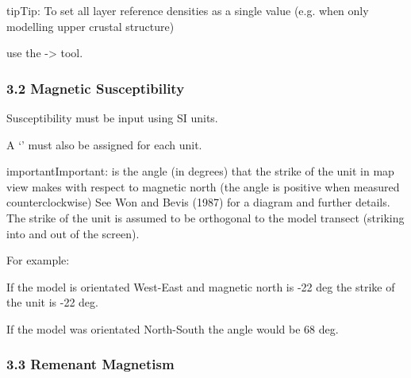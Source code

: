 \documentclass[a4paper,10pt,english]{sphinxmanual}
\begin{document}
\begin{sphinxadmonition}{tip}{Tip:}
To set all layer reference densities as a single value (e.g. when only modelling upper crustal structure)
\end{sphinxadmonition}

use the  -\textgreater{}  tool.

\begin{DUlineblock}{0em}
\item[] 
\end{DUlineblock}


\subsubsection{3.2 Magnetic Susceptibility}
\label{\detokenize{manual_layer_attributes:magnetic-susceptibility}}
Susceptibility must be input using SI units.

A ‘’ must also be assigned for each unit.

\begin{sphinxadmonition}{important}{Important:}
 is the angle (in degrees) that the strike of the unit in map view makes with respect to magnetic north
(the angle is positive when measured counterclockwise) See Won and Bevis (1987) for a diagram and further details.
The strike of the unit is assumed to be orthogonal to the model transect (striking into and out of the screen).

For example:

If the model is orientated West-East and magnetic north is -22 deg the strike of the unit is -22 deg.

If the model was orientated North-South the angle would be 68 deg.
\end{sphinxadmonition}

\begin{DUlineblock}{0em}
\item[] 
\end{DUlineblock}


\subsubsection{3.3 Remenant Magnetism}
\label{\detokenize{manual_layer_attributes:remenant-magnetism}}

\subsection{}
\label{\detokenize{manual_PF:potential-field-data}}\label{\detokenize{manual_PF::doc}}
\begin{DUlineblock}{0em}
\item[] 
\end{DUlineblock}
\end{document}
